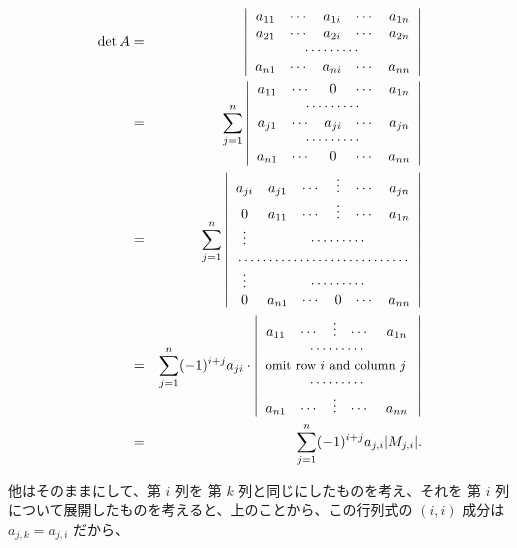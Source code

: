 \begin{eqnarray*}
\det A & = & \left|\begin{array}{ccccc}a_{11} & \cdots & a_{1i} & \cdots & a_{1n}\\
a_{21} & \cdots & a_{2i} & \cdots & a_{2n}\\
\multicolumn{5}{c}{\cdots\cdots\cdots}\\
a_{n1} & \cdots & a_{ni} & \cdots & a_{nn}
\end{array}\right|\\
& = & \sum_{j = 1}^n \left|\begin{array}{ccccc}
a_{11} & \cdots & 0 & \cdots & a_{1n}\\
\multicolumn{5}{c}{\cdots\cdots\cdots}\\
a_{j1} & \cdots & a_{ji} & \cdots & a_{jn}\\
\multicolumn{5}{c}{\cdots\cdots\cdots}\\
a_{n1} & \cdots & 0 & \cdots & a_{nn}
\end{array}\right|\\
& = & \sum_{j = 1}^n \left|\begin{array}{cccccc}
a_{ji} & a_{j1} & \cdots & \vdots & \cdots & a_{jn}\\
0 & a_{11} & \cdots &\vdots & \cdots & a_{1n}\\
\vdots & \multicolumn{5}{c}{\cdots\cdots\cdots}\\
\multicolumn{6}{c}{\dotfill}\\
\vdots & \multicolumn{5}{c}{\cdots\cdots\cdots}\\
0 & a_{n1} & \cdots & 0 & \cdots & a_{nn}
\end{array}\right|\\
& = &  \sum_{j = 1}^n (-1)^{i+j}a_{ji}\cdot\left|\begin{array}{ccccc}
a_{11} & \cdots & \vdots & \cdots & a_{1n}\\
\multicolumn{5}{c}{\cdots\cdots\cdots}\\
\multicolumn{5}{c}{\mbox{{\small omit row $i$ and column $j$ }}}\\
\multicolumn{5}{c}{\cdots\cdots\cdots}\\
a_{n1} & \cdots &\vdots & \cdots & a_{nn}
\end{array}\right|\\
& = & \sum_{j = 1}^n(-1)^{i+j}a_{j,i}|M_{j,i}|.
\end{eqnarray*}

他はそのままにして、第 $i$ 列を 第 $k$ 列と同じにしたものを考え、それを 第 $i$ 列について展開したものを考えると、上のことから、この行列式の $(i,i)$ 成分は $a_{j,k} = a_{j,i}$ だから、

